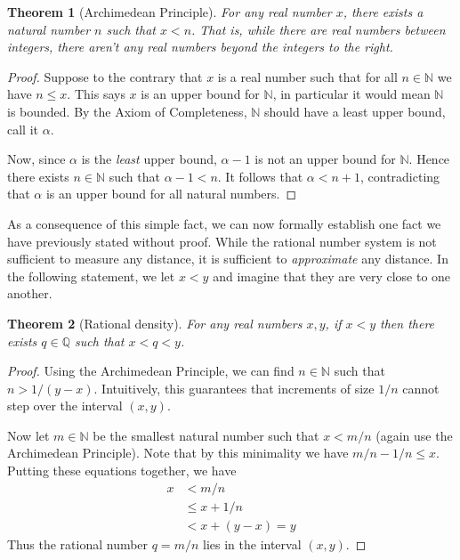 \documentclass[11pt,oneside]{amsbook}
\newcommand{\N}{\mathbb N}
\newcommand{\Q}{\mathbb Q}
\theoremstyle{definition}
\theoremstyle{plain}
\newtheorem{theorem}{Theorem}[section]
\theoremstyle{definition}
\theoremstyle{remark}
\numberwithin{equation}{section}
\numberwithin{figure}{section}
\begin{document}
\begin{theorem}[Archimedean Principle]
  For any real number $x$, there exists a natural number $n$ such that $x<n$. That is, while there are real numbers between integers, there aren't any real numbers beyond the integers to the right.
\end{theorem}

\begin{proof}
  Suppose to the contrary that $x$ is a real number such that for all $n\in\N$ we have $n\leq x$. This says $x$ is an upper bound for $\N$, in particular it would mean $\N$ is bounded. By the Axiom of Completeness, $\N$ should have a least upper bound, call it $\alpha$.

  Now, since $\alpha$ is the \emph{least} upper bound, $\alpha-1$ is not an upper bound for $\N$. Hence there exists $n\in\N$ such that $\alpha-1<n$. It follows that $\alpha<n+1$, contradicting that $\alpha$ is an upper bound for all natural numbers.
\end{proof}

\begin{center}
\end{center}

As a consequence of this simple fact, we can now formally establish one fact we have previously stated without proof. While the rational number system is not sufficient to measure any distance, it is sufficient to \emph{approximate} any distance. In the following statement, we let $x<y$ and imagine that they are very close to one another.

\begin{theorem}[Rational density]
  For any real numbers $x,y$, if $x<y$ then there exists $q\in\Q$ such that $x<q<y$.
\end{theorem}

\begin{proof}
  Using the Archimedean Principle, we can find $n\in\N$ such that $n>1/(y-x)$. Intuitively, this guarantees that increments of size $1/n$ cannot step over the interval $(x,y)$.

  Now let $m\in\N$ be the smallest natural number such that $x<m/n$ (again use the Archimedean Principle). Note that by this minimality we have $m/n-1/n\leq x$. Putting these equations together, we have
\begin{align*}
  x&<m/n\\
   &\leq x+1/n\\
   &<x+(y-x)=y
\end{align*}
Thus the rational number $q=m/n$ lies in the interval $(x,y)$.
\end{proof}
\end{document}
